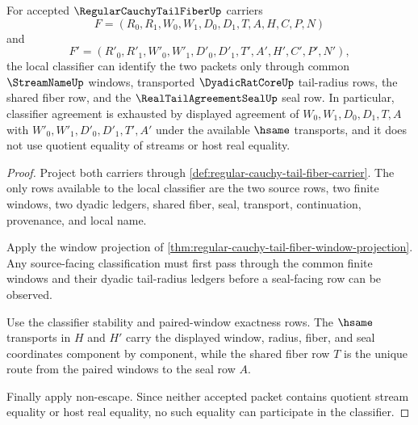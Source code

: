 \begin{theorem}
\label{thm:regular-cauchy-tail-fiber-classifier-exactness}
For accepted $\RegularCauchyTailFiberUp$ carriers
$$
F=(R_0,R_1,W_0,W_1,D_0,D_1,T,A,H,C,P,N)
$$
and
$$
F'=(R'_0,R'_1,W'_0,W'_1,D'_0,D'_1,T',A',H',C',P',N'),
$$
the local classifier can identify the two packets only through common $\StreamNameUp$ windows, transported $\DyadicRatCoreUp$ tail-radius rows, the shared fiber row, and the $\RealTailAgreementSealUp$ seal row. In particular, classifier agreement is exhausted by displayed agreement of $W_0,W_1,D_0,D_1,T,A$ with $W'_0,W'_1,D'_0,D'_1,T',A'$ under the available $\hsame$ transports, and it does not use quotient equality of streams or host real equality.
\end{theorem}
\begin{proof}
Project both carriers through \autoref{def:regular-cauchy-tail-fiber-carrier}. The only rows available to the local classifier are the two source rows, two finite windows, two dyadic ledgers, shared fiber, seal, transport, continuation, provenance, and local name.

Apply the window projection of \autoref{thm:regular-cauchy-tail-fiber-window-projection}. Any source-facing classification must first pass through the common finite windows and their dyadic tail-radius ledgers before a seal-facing row can be observed.

Use the classifier stability and paired-window exactness rows. The $\hsame$ transports in $H$ and $H'$ carry the displayed window, radius, fiber, and seal coordinates component by component, while the shared fiber row $T$ is the unique route from the paired windows to the seal row $A$.

Finally apply non-escape. Since neither accepted packet contains quotient stream equality or host real equality, no such equality can participate in the classifier.
\end{proof}

